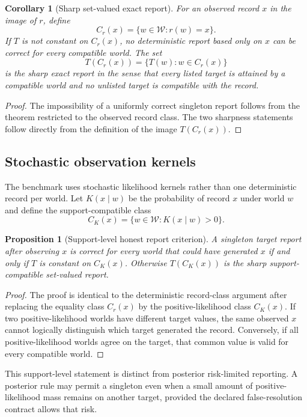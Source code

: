 \documentclass[11pt]{article}
\newtheorem{proposition}{Proposition}
\newtheorem{corollary}{Corollary}
\newcommand{\W}{\mathcal{W}}
\begin{document}
\begin{corollary}[Sharp set-valued exact report]
For an observed record $x$ in the image of $r$, define
\[
C_r(x)=\{w\in\W:r(w)=x\}.
\]
If $T$ is not constant on $C_r(x)$, no deterministic report based only on $x$ can be correct for every compatible world. The set
\[
T(C_r(x))=\{T(w):w\in C_r(x)\}
\]
is the sharp exact report in the sense that every listed target is attained by a compatible world and no unlisted target is compatible with the record.
\end{corollary}

\begin{proof}
The impossibility of a uniformly correct singleton report follows from the theorem restricted to the observed record class. The two sharpness statements follow directly from the definition of the image $T(C_r(x))$.
\end{proof}

\subsection{Stochastic observation kernels}
The benchmark uses stochastic likelihood kernels rather than one deterministic record per world. Let $K(x\mid w)$ be the probability of record $x$ under world $w$ and define the support-compatible class
\[
C_K(x)=\{w\in\W:K(x\mid w)>0\}.
\]

\begin{proposition}[Support-level honest report criterion]
A singleton target report after observing $x$ is correct for every world that could have generated $x$ if and only if $T$ is constant on $C_K(x)$. Otherwise $T(C_K(x))$ is the sharp support-compatible set-valued report.
\end{proposition}

\begin{proof}
The proof is identical to the deterministic record-class argument after replacing the equality class $C_r(x)$ by the positive-likelihood class $C_K(x)$. If two positive-likelihood worlds have different target values, the same observed $x$ cannot logically distinguish which target generated the record. Conversely, if all positive-likelihood worlds agree on the target, that common value is valid for every compatible world.
\end{proof}

This support-level statement is distinct from posterior risk-limited reporting. A posterior rule may permit a singleton even when a small amount of positive-likelihood mass remains on another target, provided the declared false-resolution contract allows that risk.
\end{document}
